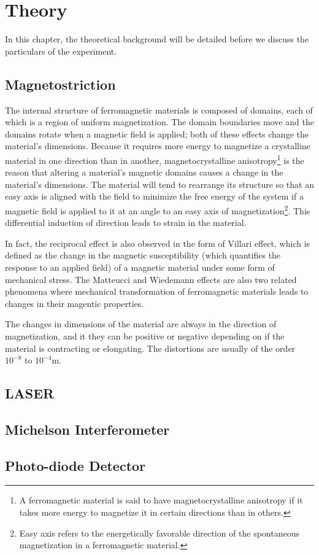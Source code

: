 \chapter{\label{method}Theory}
In this chapter, the theoretical background will be detailed before we discuss the particulars of the experiment.
\section{Magnetostriction}
The internal structure of ferromagnetic materials is composed of domains, each of which is a region of uniform magnetization. The domain boundaries move and the domains rotate when a magnetic field is applied; both of these effects change the material's dimensions. Because it requires more energy to magnetize a crystalline material in one direction than in another, magnetocrystalline anisotropy\footnote{A ferromagnetic material is said to have magnetocrystalline anisotropy if it takes more energy to magnetize it in certain directions than in others.} is the reason that altering a material's magnetic domains causes a change in the material's dimensions. The material will tend to rearrange its structure so that an easy axis is aligned with the field to minimize the free energy of the system if a magnetic field is applied to it at an angle to an easy axis of magnetization\footnote{Easy axis refers to the energetically favorable direction of the spontaneous magnetization in a ferromagnetic material.}. This differential induction of direction leads to strain in the material.

In fact, the reciprocal effect is also observed in the form of Villari effect, which is defined as the change in the magnetic susceptibility (which quantifies the response to an applied field) of a magnetic material under some form of mechanical stress. The Matteucci and Wiedemann effects are also two related phenomena where mechanical transformation of ferromagnetic materials leads to changes in their magentic properties.

The changes in dimensions of the material are always in the direction of magnetization, and it they can be positive or negative depending on if the material is contracting or elongating. The distortions are usually of the order $10^{-8}$ to $10^{-4} \si{\meter}$.
\section{LASER}

\section{Michelson Interferometer}
\section{Photo-diode Detector}

\setcounter{equation}{0}
\setcounter{table}{0}
\setcounter{figure}{0}


    



